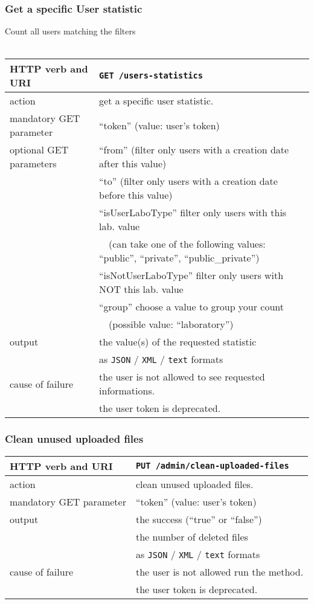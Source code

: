 \subsubsection{Get a specific User statistic}
\hspace*{\parindent}
Count all users matching the filters
\\~\\
\begin{tabular}{ | l | l | }
	\hline
	HTTP verb and URI & \texttt{GET /users-statistics} \\
	\hline
	action & get a specific user statistic. \\
	\hline
	mandatory GET parameter & ``token'' (value: user's token) \\
	\hline
	optional GET parameters & ``from'' (filter only users with a creation date after this value) \\
	\space & ``to'' (filter only users with a creation date before this value) \\
	\space & ``isUserLaboType'' filter only users with this lab. value \\
	\space & ~~(can take one of the following values: ``public'', ``private'', ``public\_private'') \\
	\space & ``isNotUserLaboType'' filter only users with NOT this lab. value \\
	\space & ``group'' choose a value to group your count \\
	\space & ~~(possible value: ``laboratory'') \\
	\hline
	output & the value(s) of the requested statistic \\
	\space & as \texttt{JSON} / \texttt{XML} / \texttt{text} formats \\
	\hline
	cause of failure & the user is not allowed to see requested informations. \\
	\space & the user token is deprecated. \\
	\hline
\end{tabular}
\newline

\subsubsection{Clean unused uploaded files}
\begin{tabular}{ | l | l | }
	\hline
	HTTP verb and URI & \texttt{PUT /admin/clean-uploaded-files} \\
	\hline
	action & clean unused uploaded files. \\
	\hline
	mandatory GET parameter & ``token'' (value: user's token) \\
	\hline
	output & the success (``true'' or ``false'') \\
	\space & the number of deleted files \\
	\space & as \texttt{JSON} / \texttt{XML} / \texttt{text} formats \\
	\hline
	cause of failure & the user is not allowed run the method. \\
	\space & the user token is deprecated. \\
	\hline
\end{tabular}
\newline

